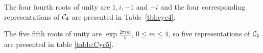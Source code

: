 \begin{example}[$\Cyc_4$]
	The four fourth roots of unity are $1,i,-1$ and $-i$ and the four corresponding representations of $\Cyc_4$ are presented in Table~\ref{tbl:cyc4}. %
\end{example}
	
\begin{example}[$\Cyc_5$]
	The five fifth roots of unity are $\exp{\frac{2\pi im}{5}}$, $0 \leq m \leq 4$, so five representations of $\Cyc_5$ are presented in table \ref{table:Cyc5}. %
	
%			
\end{example}



